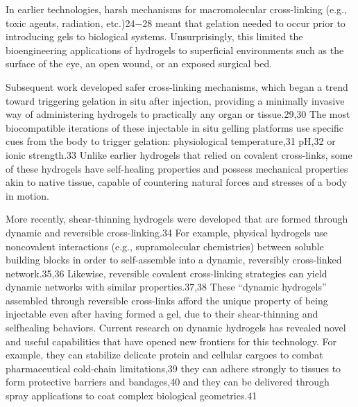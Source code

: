 \documentclass[../../main-notes.tex]{subfiles}
\begin{document}
In earlier technologies, harsh mechanisms for macromolecular cross-linking (e.g., toxic agents, radiation,  etc.)24−28 meant that gelation needed to occur prior to introducing gels to biological systems. 
Unsurprisingly, this limited the bioengineering applications of hydrogels to superficial environments such as the surface of the eye, an open wound, or an exposed surgical bed. 

Subsequent work developed safer cross-linking mechanisms, which began a trend toward triggering gelation in situ after injection, providing a minimally invasive way of administering  hydrogels to practically any organ or tissue.29,30 
The most biocompatible iterations of these injectable in situ gelling platforms use specific cues from the body to trigger gelation:  physiological temperature,31 pH,32 or ionic strength.33 
Unlike earlier hydrogels that relied on covalent cross-links, some of these hydrogels have self-healing properties and possess mechanical properties akin to native tissue, capable of countering natural forces and stresses of a body in motion.


More recently, shear-thinning hydrogels were developed that are formed through dynamic and reversible cross-linking.34 
For example, physical hydrogels use noncovalent interactions (e.g., supramolecular chemistries) between soluble building blocks in order to self-assemble into a dynamic, reversibly cross-linked  network.35,36 
Likewise, reversible covalent cross-linking strategies can yield dynamic networks with similar properties.37,38 
These “dynamic hydrogels” assembled through reversible cross-links afford the unique property of being injectable even after having formed a gel, due to their shear-thinning and selfhealing behaviors. 
Current research on dynamic hydrogels has revealed novel and useful capabilities that have opened new frontiers for this technology. 
For example, they can stabilize delicate protein and cellular cargoes to combat pharmaceutical  cold-chain limitations,39 they can adhere strongly to tissues to  form protective barriers and bandages,40 and they can be delivered through spray applications to coat complex biological  geometries.41
\end{document}
